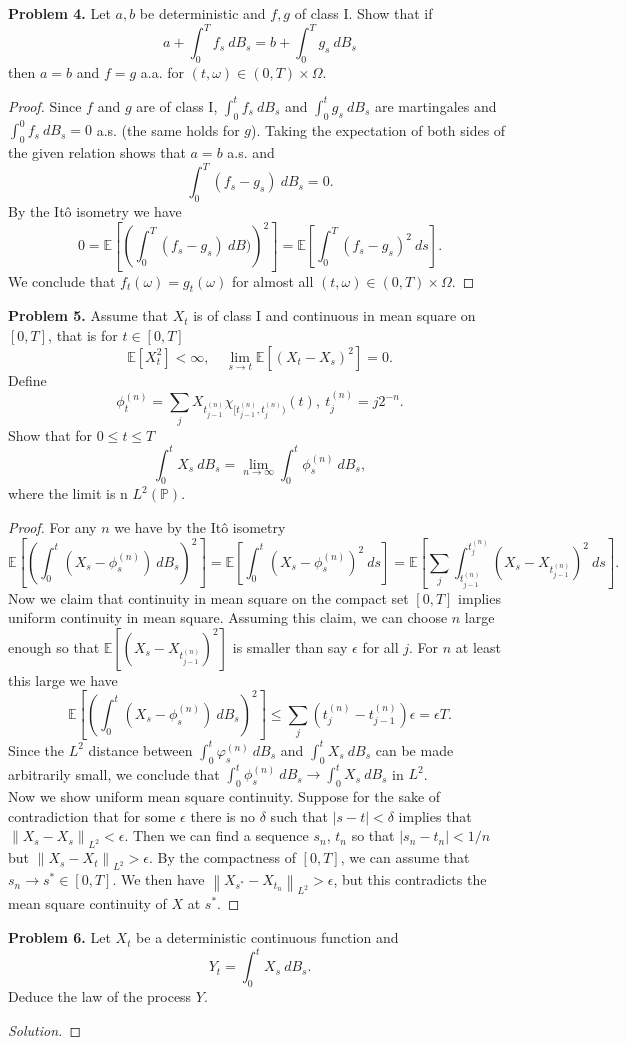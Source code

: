 \documentclass[11pt,letterpaper]{report}
\newcommand{\Lp}[2]{\left\|{#1}\right\|_{L^{#2}}}
\newcommand{\E}{\mathbb{E}}
\newcommand{\Prob}{\mathbb{P}}
\newenvironment{solution}
{\begin{proof}[Solution]}
{\end{proof}}
\begin{document}
\noindent\textbf{Problem 4. }
Let $a,b$ be deterministic and $f,g$ of class I. Show that if
\begin{equation}\label{ints}
a + \int_0^Tf_s\ dB_s = b+ \int_0^Tg_s\ dB_s
\end{equation}
then $a = b$ and $f = g$ a.a. for $(t, \omega) \in (0, T)\times \Omega$.
\begin{proof}
	Since $f$ and $g$ are of class I, $\int_0^t f_s\ dB_s$ and $\int_0^t g_s\ dB_s$ are martingales and $\int_0^0 f_s\ dB_s = 0$ a.s. (the same holds for $g$). Taking the expectation of both sides of the given relation shows that $a = b$ a.s. and
	\[
	\int_0^T(f_s - g_s)\ dB_s = 0.
	\]
	By the It\^o isometry we have
	\[
	0 = \E\left[\left(\int_0^T(f_s - g_s)\ dB)\right)^2\right] = \E\left[\int_0^T(f_s - g_s)^2\ ds\right].
	\]
	We conclude that $f_t(\omega) = g_t(\omega)$ for almost all $(t, \omega)\in (0, T)\times \Omega$.
\end{proof}

\noindent\textbf{Problem 5. }
Assume that $X_t$ is of class I and continuous in mean square on $[0, T]$, that is for $t\in [0, T]$
\[
\E[X_t^2]<\infty,\quad \lim_{s\to t}\E[(X_t-X_s)^2] = 0.
\]
Define
\[
\phi_t^{(n)} = \sum_jX_{t^{(n)}_{j-1}}\chi_{[t^{(n)}_{j-1}, t^{(n)}_j)}(t),\ t^{(n)}_j = j2^{-n}.
\]
Show that for $0\leq t\leq T$
\[
\int_0^tX_s\ dB_s = \lim_{n\to \infty}\int_0^t\phi^{(n)}_s\ dB_s,
\]
where the limit is n $L^2(\Prob)$.
\begin{proof}
	For any $n$ we have by the It\^o isometry
	\[
	\E\left[\left(\int_0^t(X_s - \phi^{(n)}_s)\ dB_s\right)^2\right] = \E\left[\int_0^t(X_s - \phi^{(n)}_s)^2\ ds\right] = \E\left[\sum_j\int_{t_{j-1}^{(n)}}^{t_j^{(n)}} (X_s - X_{t_{j-1}^{(n)}})^2\ ds \right].
	\]
	Now we claim that continuity in mean square on the compact set $[0, T]$ implies uniform continuity in mean square. Assuming this claim, we can choose $n$ large enough so that $\E[(X_s - X_{t_{j-1}^{(n)}})^2]$ is smaller than say $\epsilon$ for all $j$. For $n$ at least this large we have
	\[
	\E\left[\left(\int_0^t(X_s - \phi^{(n)}_s)\ dB_s\right)^2\right] \leq \sum_j(t_j^{(n)} - t_{j-1}^{(n)})\epsilon = \epsilon T.
	\]
	Since the $L^2$ distance between $\int_0^t\varphi_s^{(n)}\ dB_s$ and $\int_0^tX_s\ dB_s$ can be made arbitrarily small, we conclude that $\int_0^t \phi_s^{(n)}\ dB_s\to \int_0^tX_s\ dB_s$ in $L^2$.\\

	\noindent Now we show uniform mean square continuity. Suppose for the sake of contradiction that for some $\epsilon$ there is no $\delta$ such that $|s-t|<\delta$ implies that $\Lp{X_s - X_s}{2}<\epsilon$. Then we can find a sequence $s_n$, $t_n$ so that $|s_n-t_n|<1/n$ but $\Lp{X_s-X_t}{2}>\epsilon$. By the compactness of $[0, T]$, we can assume that $s_n\to s^*\in [0, T]$. We then have $\Lp{X_{s^*}-X_{t_n}}{2}>\epsilon$, but this contradicts the mean square continuity of $X$ at $s^*$.
\end{proof}

\noindent\textbf{Problem 6. }
Let $X_t$ be a deterministic continuous function and 
\[
Y_t = \int_0^tX_s\ dB_s.
\]
Deduce the law of the process $Y$.
\begin{solution}
	
\end{solution}
\end{document}
